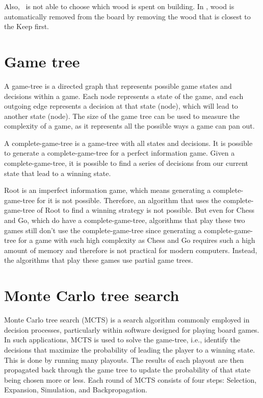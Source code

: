 Also, \Marquise \ is not able to choose which wood is spent on building. In \RootV, wood is automatically removed from the board by removing the wood that is closest to the Keep first. 

\section{Game tree}
A \gls{game-tree} is a directed graph that represents possible game states and decisions within a game. Each node represents a state of the game, and each outgoing edge represents a decision at that state (node), which will lead to another state (node). The size of the game tree can be used to measure the complexity of a game, as it represents all the possible ways a game can pan out.

A \gls{complete-game-tree} is a \gls{game-tree} with all states and decisions. It is possible to generate a \gls{complete-game-tree} for a perfect information game. Given a \gls{complete-game-tree}, it is possible to find a series of decisions from our current state that lead to a winning state.

Root is an imperfect information game, which means generating a \gls{complete-game-tree} for it is not possible. Therefore, an algorithm that uses the \gls{complete-game-tree} of Root to find a winning strategy is not possible. But even for Chess and Go, which do have a \gls{complete-game-tree}, algorithms that play these two games still don't use the \gls{complete-game-tree} since generating a \gls{complete-game-tree} for a game with such high complexity as Chess and Go requires such a high amount of memory and therefore is not practical for modern computers. Instead, the algorithms that play these games use partial game trees.


\section{Monte Carlo tree search}
Monte Carlo tree search (MCTS) is a search algorithm commonly employed in decision processes, particularly within software designed for playing board games. In such applications, MCTS is used to solve the \gls{game-tree}, i.e., identify the decisions that maximize the probability of leading the player to a winning state. This is done by running many \glspl{playout}. The results of each \gls{playout} are then propagated back through the game tree to update the probability of that state being chosen more or less. Each round of MCTS consists of four steps: Selection, Expansion, Simulation, and Backpropagation.

